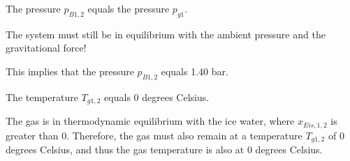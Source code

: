 The pressure \( p_{B1,2} \) equals the pressure \( p_{g1} \).

The system must still be in equilibrium with the ambient pressure and the gravitational force!

This implies that the pressure \( p_{B1,2} \) equals 1.40 bar.

The temperature \( T_{g1,2} \) equals 0 degrees Celsius.

The gas is in thermodynamic equilibrium with the ice water, where \( x_{Eis,1,2} \) is greater than 0. Therefore, the gas must also remain at a temperature \( T_{g1,2} \) of 0 degrees Celsius, and thus the gas temperature is also at 0 degrees Celsius.